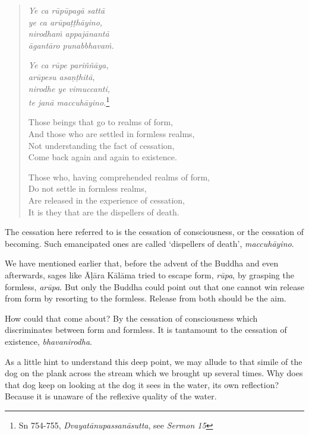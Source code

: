 \begin{quote}
\emph{Ye ca rūpūpagā sattā}\\
\emph{ye ca arūpaṭṭhāyino,}\\
\emph{nirodhaṁ appajānantā}\\
\emph{āgantāro punabbhavaṁ.}

\emph{Ye ca rūpe pariññāya,}\\
\emph{arūpesu asaṇṭhitā,}\\
\emph{nirodhe ye vimuccanti,}\\
\emph{te janā maccuhāyino.}\footnote{Sn 754-755, \emph{Dvayatānupassanāsutta}, see \emph{Sermon 15}}

Those beings that go to realms of form,\\
And those who are settled in formless realms,\\
Not understanding the fact of cessation,\\
Come back again and again to existence.

Those who, having comprehended realms of form,\\
Do not settle in formless realms,\\
Are released in the experience of cessation,\\
It is they that are the dispellers of death.
\end{quote}

The cessation here referred to is the cessation of consciousness, or the cessation of becoming. Such emancipated ones are called `dispellers of death', \emph{maccuhāyino}.

\enlargethispage{\baselineskip}

We have mentioned earlier that, before the advent of the Buddha and even afterwards, sages like Āḷāra Kālāma tried to escape form, \emph{rūpa}, by grasping the formless, \emph{arūpa}. But only the Buddha could point out that one cannot win release from form by resorting to the formless. Release from both should be the aim.

How could that come about? By the cessation of consciousness which discriminates between form and formless. It is tantamount to the cessation of existence, \emph{bhavanirodha}.

As a little hint to understand this deep point, we may allude to that simile of the dog on the plank across the stream which we brought up several times. Why does that dog keep on looking at the dog it sees in the water, its own reflection? Because it is unaware of the reflexive quality of the water.

